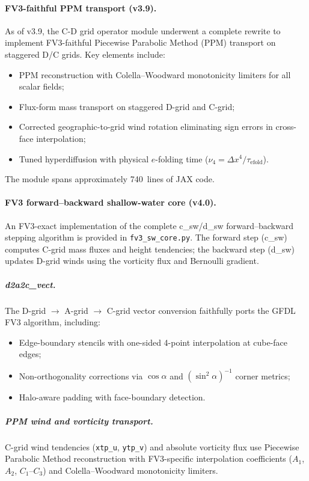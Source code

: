 \documentclass[11pt,twoside]{report}
\begin{document}
\paragraph{FV3-faithful PPM transport (v3.9).}
As of v3.9, the C-D grid operator module underwent a complete rewrite
to implement FV3-faithful Piecewise Parabolic Method (PPM) transport
\citep{ColellaWoodward1984} on staggered D/C grids.  Key elements include:
\begin{itemize}[nosep]
  \item PPM reconstruction with Colella--Woodward monotonicity limiters
    for all scalar fields;
  \item Flux-form mass transport on staggered D-grid and C-grid;
  \item Corrected geographic-to-grid wind rotation eliminating
    sign errors in cross-face interpolation;
  \item Tuned hyperdiffusion with physical $e$-folding time
    ($\nu_4 = \Delta x^4/\tau_{\mathrm{efold}}$).
\end{itemize}
The module spans approximately 740~lines of JAX code.

\paragraph{FV3 forward--backward shallow-water core (v4.0).}
An FV3-exact implementation of the complete c\_sw/d\_sw forward--backward
stepping algorithm is provided in \texttt{fv3\_sw\_core.py}.  The forward
step (c\_sw) computes C-grid mass fluxes and height tendencies; the backward
step (d\_sw) updates D-grid winds using the vorticity flux and Bernoulli
gradient.

\subparagraph{d2a2c\_vect.}
The D-grid $\to$ A-grid $\to$ C-grid vector conversion faithfully ports
the GFDL FV3 algorithm, including:
\begin{itemize}[nosep]
  \item Edge-boundary stencils with one-sided 4-point interpolation at
    cube-face edges;
  \item Non-orthogonality corrections via $\cos\alpha$ and
    $(\sin^2\!\alpha)^{-1}$ corner metrics;
  \item Halo-aware padding with face-boundary detection.
\end{itemize}

\subparagraph{PPM wind and vorticity transport.}
C-grid wind tendencies (\texttt{xtp\_u}, \texttt{ytp\_v}) and absolute
vorticity flux use Piecewise Parabolic Method reconstruction with
FV3-specific interpolation coefficients ($A_1$, $A_2$, $C_1$--$C_3$)
and Colella--Woodward monotonicity limiters.
\end{document}
